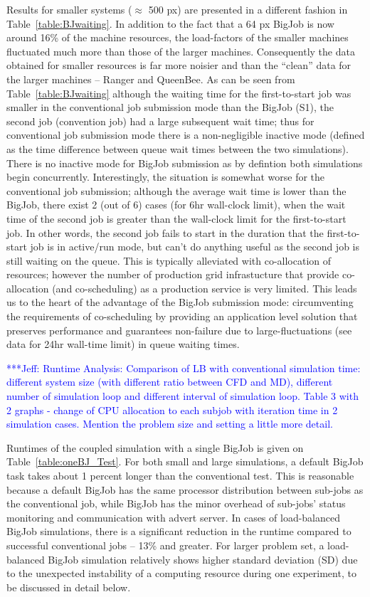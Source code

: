 \documentclass[conference,final]{IEEEtran}
\newcommand{\skonote}[1]{ {\textcolor{blue} { ***Jeff: #1 }}}
\newcommand{\skonote}[1]{}
\begin{document}
Results for smaller systems ($\approx$ 500 px) are presented in a different fashion in Table~\ref{table:BJwaiting}. In addition to the fact that a 64 px BigJob is now around 16\% of the machine resources, the load-factors of the smaller machines fluctuated much more than those of the larger machines. Consequently the data obtained for smaller resources is far more noisier and than the ``clean'' data for the larger machines -- Ranger and QueenBee. As can be seen from Table~\ref{table:BJwaiting} although the waiting time for the first-to-start job was smaller in the conventional job submission mode than the BigJob (S1), the second job (convention job) had a large subsequent wait time; thus for conventional job submission mode there is a non-negligible inactive mode (defined as the time difference between queue wait times between the two simulations). There is no inactive mode for BigJob submission as by defintion both simulations begin concurrently. Interestingly, the situation is somewhat worse for the conventional job submission; although the average wait time is lower than the BigJob, there exist 2 (out of 6) cases (for 6hr wall-clock limit), when the wait time of the second job is greater than the wall-clock limit for the first-to-start job. In other words, the second job fails to start in the duration that the first-to-start job is in active/run mode, but can't do anything useful as the second job is still waiting on the queue. This is typically alleviated with co-allocation of resources; however the number of production grid infrastucture that provide co-allocation (and co-scheduling) as a production service is very limited. This leads us to the heart of the advantage of the BigJob submission mode: circumventing the requirements of co-scheduling by providing an application level solution that preserves performance and guarantees non-failure due to large-fluctuations (see data for 24hr wall-time limit) in queue waiting times.



\skonote{Runtime Analysis: Comparison of LB with conventional simulation time: different system size (with different ratio between CFD and MD), different number of simulation loop and different interval of simulation loop. Table 3 with 2 graphs - change of CPU allocation to each subjob with iteration time in 2 simulation cases. Mention the problem size and setting a little more detail.}

Runtimes of the coupled simulation with a single BigJob is given on Table~\ref{table:oneBJ_Test}. For both small and large simulations, a default BigJob task takes about 1 percent longer than the conventional test. This is reasonable because a default BigJob has the same processor distribution between sub-jobs as the conventional job, while BigJob has the minor overhead of sub-jobs' status monitoring and communication with advert server. In cases of load-balanced BigJob simulations, there is a significant reduction in the runtime compared to successful conventional jobs -- 13\% and greater. For larger problem set, a load-balanced BigJob simulation relatively shows higher standard deviation (SD) due to the unexpected instability of a computing resource during one experiment, to be discussed in detail below.
\end{document}
